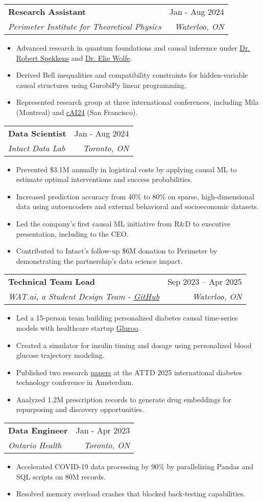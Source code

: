 \documentclass[letterpaper,11pt]{article}
\makeatletter
\newcommand{\resumeItem}[1]{
  \item\small{
    {#1 \vspace{-2pt}}
  }
}
\newcommand{\resumeSubheading}[4]{
  \vspace{-2pt}\item
    \begin{tabular*}{0.97\textwidth}[t]{l@{\extracolsep{\fill}}r}
      \textbf{#1} & #2 \\
      \textit{\small#3} & \textit{\small #4} \\
    \end{tabular*}\vspace{-7pt}
}
\newcommand{\resumeItemListStart}{\begin{itemize}}
\newcommand{\resumeItemListEnd}{\end{itemize}\vspace{-5pt}}
\makeatother
\begin{document}
  \resumeSubheading
      {Research Assistant}{Jan - Aug 2024}
      {Perimeter Institute for Theoretical Physics}{Waterloo, ON}
      \resumeItemListStart
        \resumeItem{Advanced research in quantum foundations and causal inference under \href{https://en.wikipedia.org/wiki/Robert_Spekkens}{\underline{Dr. Robert Spekkens}} and \href{https://scholar.google.ca/citations?user=ETM3qzAAAAAJ&hl=en}{\underline{Dr. Elie Wolfe}}.}
        \resumeItem{Derived Bell inequalities and compatibility constraints for hidden-variable causal structures using GurobiPy linear programming.}
        \resumeItem{Represented research group at three international conferences, including Mila (Montreal) and \href{https://conference.causalens.com/}{\underline{cAI24}} (San Francisco).}
      \resumeItemListEnd
  
    \resumeSubheading
      {Data Scientist}{Jan - Aug 2024}
      {Intact Data Lab}{Toronto, ON}
      \resumeItemListStart
        \resumeItem{Prevented \$3.1M annually in logistical costs by applying causal ML to estimate optimal interventions and success probabilities.}
        \resumeItem{Increased prediction accuracy from 40\% to 80\% on sparse, high-dimensional data using autoencoders and external behavioral and socioeconomic datasets.}
        \resumeItem{Led the company’s first causal ML initiative from R\&D to executive presentation, including to the CEO.}
        \resumeItem{Contributed to Intact’s follow-up \$6M donation to Perimeter by demonstrating the partnership’s data science impact.}
      \resumeItemListEnd

    \resumeSubheading
      {Technical Team Lead}{Sep 2023 – Apr 2025}
      {WAT.ai, a Student Design Team - \href{https://github.com/Blood-Glucose-Control}{\underline{GitHub}}}{Waterloo, ON}
      \resumeItemListStart
        \resumeItem{Led a 15-person team building personalized diabetes causal time-series models with healthcare startup \href{https://gluroo.com/}{\underline{Gluroo}}.}
        \resumeItem{Created a simulator for insulin timing and dosage using personalized blood glucose trajectory modeling.}
        \resumeItem{Published two research \href{https://doi.org/10.1089/dia.2024.78502.abstracts.part5}{\underline{papers}} at the ATTD 2025 international diabetes technology conference in Amsterdam.}
        \resumeItem{Analyzed 1.2M prescription records to generate drug embeddings for repurposing and discovery opportunities.}
      \resumeItemListEnd

    \resumeSubheading
      {Data Engineer}{Jan - Apr 2023}
      {Ontario Health}{Toronto, ON}
      \resumeItemListStart
        \resumeItem{Accelerated COVID-19 data processing by 90\% by parallelizing Pandas and SQL scripts on 80M records.}
        \resumeItem{Resolved memory overload crashes that blocked back-testing capabilities.}
      \resumeItemListEnd
\end{document}
